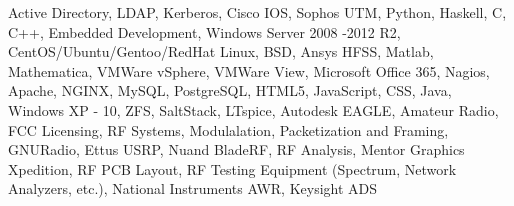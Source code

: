 

\begin{cventries}
    \begin{cvitems}
        \footnotesize
    \item {Active Directory, LDAP, Kerberos, Cisco IOS, Sophos UTM, Python, Haskell, C, C++, Embedded Development, Windows Server 2008 -2012 R2, CentOS/Ubuntu/Gentoo/RedHat Linux, BSD, Ansys HFSS, Matlab, Mathematica, VMWare vSphere, VMWare View, Microsoft Office 365, Nagios, Apache, NGINX, MySQL, PostgreSQL, HTML5, JavaScript, CSS, Java, Windows XP - 10, ZFS, SaltStack, LTspice, Autodesk EAGLE, Amateur Radio, FCC Licensing, RF Systems, Modulalation, Packetization and Framing, GNURadio, Ettus USRP, Nuand BladeRF, RF Analysis, Mentor Graphics Xpedition, RF PCB Layout, RF Testing Equipment (Spectrum, Network Analyzers, etc.), National Instruments AWR, Keysight ADS}
    \end{cvitems}
\end{cventries}
